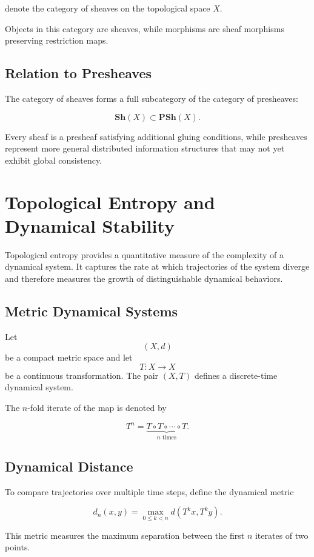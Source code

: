 \documentclass[12pt]{article}
\begin{document}
denote the category of sheaves on the topological space $X$.

Objects in this category are sheaves, while morphisms are sheaf morphisms preserving restriction maps.

\subsection{Relation to Presheaves}

The category of sheaves forms a full subcategory of the category of presheaves:

\[
\mathbf{Sh}(X) \subset \mathbf{PSh}(X).
\]

Every sheaf is a presheaf satisfying additional gluing conditions, while presheaves represent more general distributed information structures that may not yet exhibit global consistency.

\section{Topological Entropy and Dynamical Stability}

Topological entropy provides a quantitative measure of the complexity of a dynamical system. It captures the rate at which trajectories of the system diverge and therefore measures the growth of distinguishable dynamical behaviors.

\subsection{Metric Dynamical Systems}

Let
\[
(X,d)
\]
be a compact metric space and let
\[
T : X \rightarrow X
\]
be a continuous transformation. The pair $(X,T)$ defines a discrete-time dynamical system.

The $n$-fold iterate of the map is denoted by

\[
T^n = \underbrace{T \circ T \circ \cdots \circ T}_{n \text{ times}}.
\]

\subsection{Dynamical Distance}

To compare trajectories over multiple time steps, define the dynamical metric

\[
d_n(x,y) = \max_{0 \le k < n} d(T^k x, T^k y).
\]

This metric measures the maximum separation between the first $n$ iterates of two points.
\end{document}
